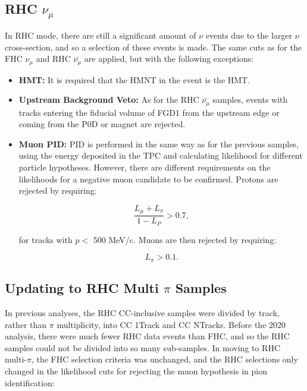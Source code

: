 \subsection{RHC $\nu_{\mu}$}

In RHC mode, there are still a significant amount of $\nu$ events due to the larger $\nu$ cross-section, and so a selection of these events is made. The same cuts as for the FHC $\nu_{\mu}$ and RHC $\bar{\nu_{\mu}}$ are applied, but with the following exceptions:

\begin{itemize}

\item \textbf{HMT:} It is required that the HMNT  in the event is the HMT.

\item \textbf{Upstream Background Veto:} As for the RHC $\bar{\nu_{\mu}}$ samples, events with tracks entering the fiducial volume of FGD1 from the upstream edge or coming from the P0D or magnet are rejected.

\item \textbf{Muon PID:} PID is performed in the same way as for the previous samples, using the energy deposited in the TPC and calculating likelihood for different particle hypotheses. However, there are different requirements on the likelihoods for a negative muon candidate to be confirmed. Protons are rejected by requiring:

\begin{equation}
\frac{L_{\mu}+L_{\pi}}{1-L_P} > 0.7,
\end{equation}

for tracks with  $p <$ 500 MeV/c. Muons are then rejected by requiring:

\begin{equation}
L_{\pi} > 0.1.
\end{equation}

\end{itemize}

\subsection{Updating to RHC Multi $\pi$ Samples}

In previous analyses, the RHC CC-inclusive samples were divided by track, rather than $\pi$ multiplicity, into CC 1Track and CC NTracks. Before the 2020 analysis, there were much fewer RHC data events than FHC, and so the RHC samples could not be divided into so many sub-samples. In moving to RHC multi-$\pi$, the FHC selection criteria was unchanged, and the RHC selections only changed in the likelihood cuts for rejecting the muon hypothesis in pion identification:

